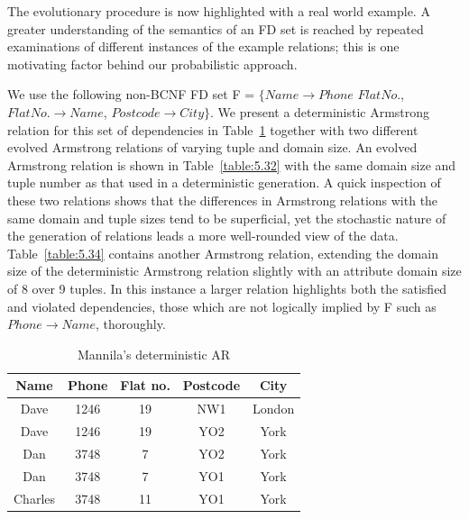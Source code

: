 \medskip

The evolutionary procedure is now highlighted with a real world 
example. A greater understanding of the semantics of 
an FD set
is reached by repeated examinations of different instances of the
example relations; this is one motivating factor behind our probabilistic approach.
\begin{example}
\begin{rm}
We use the following non-BCNF FD set F =
$\{ Name \to Phone$ $Flat No.$, $Flat No. \to Name$, $Postcode \to City \}$.
We present a deterministic Armstrong relation for this set of 
dependencies in Table~\ref{table:5.31} together with two different
evolved Armstrong relations 
of varying tuple and domain size. An evolved
Armstrong relation is shown in Table~\ref{table:5.32} with the same
domain size and tuple number as that used in a deterministic
generation. A quick 
inspection of these two relations shows that the differences in 
Armstrong relations with the same domain and tuple sizes tend to be
superficial, yet the stochastic nature of the generation of relations leads
 a more well-rounded view of the data. Table~\ref{table:5.34} contains another Armstrong relation, 
extending the domain size of the deterministic Armstrong relation
slightly with an attribute domain size of 8 over 9 tuples. In
this instance a larger relation highlights both the satisfied
and violated dependencies, those which are not logically implied by F
such as $Phone \to Name$, thoroughly. 
\end{rm}
\end{example}
{\line
\begin{table}[ht]
\begin{center}
\begin{tabular}{|c|c|c|c|c|} \hline 
{ \bf Name} & { \bf Phone} & {\bf Flat no. }  & { \bf Postcode}  & {\bf City} \\ \hline
Dave & 1246 & 19 & NW1 & London  \\
Dave & 1246 & 19 & YO2 & York \\
Dan & 3748 & 7 & YO2 & York \\
Dan & 3748 & 7 & YO1 & York \\
Charles & 3748 & 11 & YO1 & York \\ \hline
\end{tabular}
\end{center}
\caption{\label{table:5.31} Mannila's deterministic AR}
\end{table}
}

